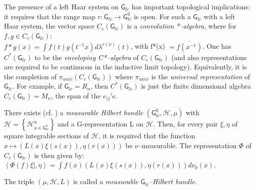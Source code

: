 \documentclass[12pt]{article}
\theoremstyle{plain}
\theoremstyle{definition}
\numberwithin{equation}{section}
\renewcommand{\H}{\mathcal H}
\newcommand{\grp}{{\mathsf{G}}}
\newcommand{\med}{\medbreak}
\newcommand{\<}{{\langle}}
\begin{document}
The presence of a left Haar system on $\grp_{lc}$ has important
topological implications: it requires that the range map $r :
\grp_{lc} \rightarrow \grp_{lc}^0$ is open. For such a $\grp_{lc}$
with a left Haar system, the vector space $C_c(\grp_{lc})$ is a
\textit{convolution} \textit{*--algebra}, where for $f, g \in
C_c(\grp_{lc})$: \\
\med
$f * g(x) = \int f(t)g(t^{-1} x) d \lambda^{r(x)} (t)$,  with
f*(x) $ = \overline{f(x^{-1})}$.
\med
One has $C^*(\grp_{lc})$ to be the \textit{enveloping C*--algebra}
of $C_c(\grp_{lc})$ (and also representations are required to be
continuous in the inductive limit topology). Equivalently, it is
the completion of $\pi_{univ}(C_c(\grp_{lc}))$ where $\pi_{univ}$
is the \textit{universal representation} of $\grp_{lc}$. For
example, if $ \grp_{lc} = R_n$, then $C^*(\grp_{lc})$ is just the
finite dimensional algebra $C_c(\grp_{lc}) = M_n$, the span of the
$e_{ij}'$s.


There exists (cf. \cite{BRM2k3}) a \textit{measurable Hilbert bundle}
$(\grp_{lc}^0, \H, \mu)$ with $\H  = \left\{ \H^u_{u \in
\grp_{lc}^0} \right\}$ and a G-representation L on $\H$.  Then,
for every pair $\xi, \eta$ of square integrable sections of $\H$,
it is required that the function $x \mapsto (L(x)\xi (s(x)), \eta
(r(x)))$ be $\nu$--measurable. The representation $\Phi$ of
$C_c(\grp_{lc})$ is then given by:\\ $\left\langle \Phi(f) \xi
\vert,\eta \right\rangle = \int f(x)(L(x) \xi (s(x)), \eta (r(x)))
d \nu_0(x)$.


The triple $(\mu, \H, L)$ is called a \textit{measurable
$\grp_{lc}$--Hilbert bundle}.
\end{document}

